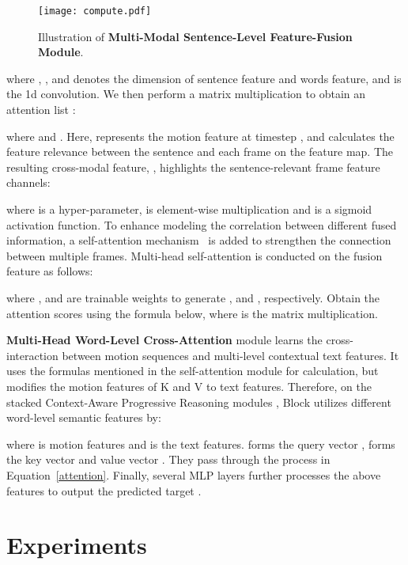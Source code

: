 \documentclass[10pt,twocolumn,letterpaper]{article}
\begin{document}
  \begin{figure}[h]
  \centering
  \texttt{[image: compute.pdf]}
  \caption{Illustration of \textbf{Multi-Modal Sentence-Level Feature-Fusion Module}.}
  \label{fig:compute}
\end{figure}


where , ,  and  denotes the dimension of sentence feature and words feature, and  is the 1d convolution. 
We then perform a matrix multiplication to obtain an attention list :

where  and . 
Here,  represents the motion feature at timestep , and  calculates the feature relevance between the sentence and each frame on the feature map. The resulting cross-modal feature, , highlights the sentence-relevant frame feature channels:

where  is a hyper-parameter,  is element-wise multiplication and  is a sigmoid activation function. 
To enhance modeling the correlation between different fused information, a self-attention mechanism~\cite{vaswani2017attention} is added to strengthen the connection between multiple frames. Multi-head self-attention is conducted on the fusion feature  as follows:

where ,  and  are trainable weights to generate ,  and , respectively. Obtain the attention scores using the formula below, where  is the matrix multiplication.









\textbf{Multi-Head Word-Level Cross-Attention} module learns the cross-interaction between motion sequences and multi-level contextual text features. It uses the formulas mentioned in the self-attention module for calculation, but modifies the motion features of K and V to text features. Therefore, on the stacked Context-Aware Progressive Reasoning modules , Block  utilizes different word-level semantic features by:

where  is motion features and  is the text features.  forms the query vector ,  forms the key vector  and value vector . They pass through the process in Equation~\ref{attention}. Finally, several MLP layers further processes the above features to output the predicted target .






\section{Experiments}
\end{document}
